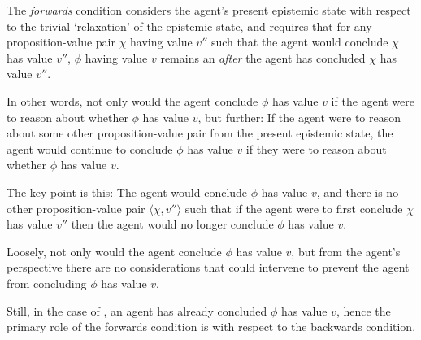 \begin{note}[Forwards]
  The \emph{forwards} condition considers the agent's present epistemic state with respect to the trivial `relaxation' of the epistemic state, and requires that for any proposition-value pair \(\chi\) having value \(v''\) such that the agent would conclude \(\chi\) has value \(v''\), \(\phi\) having value \(v\) remains an \sink{} \emph{after} the agent has concluded \(\chi\) has value \(v''\).

  In other words, not only would the agent conclude \(\phi\) has value \(v\) if the agent were to reason about whether \(\phi\) has value \(v\), but further:
  If the agent were to reason about some other proposition-value pair from the present epistemic state, the agent would continue to conclude \(\phi\) has value \(v\) if they were to reason about whether \(\phi\) has value \(v\).

  The key point is this:
  The agent would conclude \(\phi\) has value \(v\), and there is no other proposition-value pair \(\langle \chi, v'' \rangle\) such that if the agent were to first conclude \(\chi\) has value \(v''\) then the agent would no longer conclude \(\phi\) has value \(v\).

  Loosely, not only would the agent conclude \(\phi\) has value \(v\), but from the agent's perspective there are no considerations that could intervene to prevent the agent from concluding \(\phi\) has value \(v\).

  Still, in the case of \ideaS{}, an agent has already concluded \(\phi\) has value \(v\), hence the primary role of the forwards condition is with respect to the backwards condition.
\end{note}

